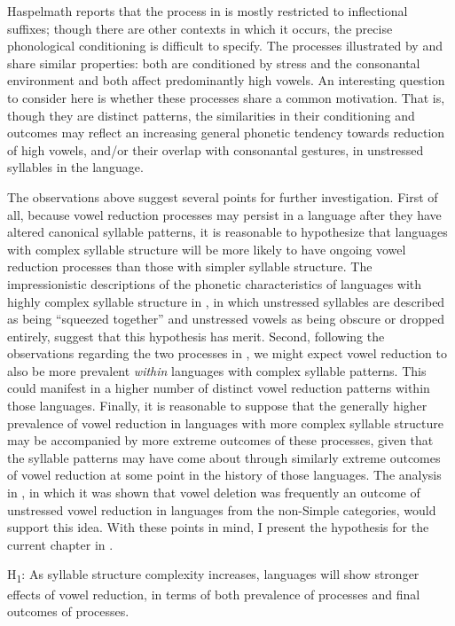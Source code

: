 Haspelmath reports that the process in  is mostly restricted to inflectional suffixes; though there are other contexts in which it occurs, the precise phonological conditioning is difficult to specify. The processes illustrated by  and  share similar properties: both are conditioned by stress and the consonantal environment and both affect predominantly high vowels. An interesting question to consider here is whether these processes share a common motivation. That is, though they are distinct patterns, the similarities in their conditioning and outcomes may reflect an increasing general phonetic tendency towards reduction of high vowels, and/or their overlap with consonantal gestures, in unstressed syllables in the language.

  The observations above suggest several points for further investigation. First of all, because vowel reduction processes may persist in a language after they have altered canonical syllable patterns, it is reasonable to hypothesize that languages with complex syllable structure will be more likely to have ongoing vowel reduction processes than those with simpler syllable structure. The impressionistic descriptions of the phonetic characteristics of languages with highly complex syllable structure in , in which unstressed syllables are described as being “squeezed together” and unstressed vowels as being obscure or dropped entirely, suggest that this hypothesis has merit. Second, following the observations regarding the two processes in , we might expect vowel reduction to also be more prevalent \textit{within} languages with complex syllable patterns. This could manifest in a higher number of distinct vowel reduction patterns within those languages. Finally, it is reasonable to suppose that the generally higher prevalence of vowel reduction in languages with more complex syllable structure may be accompanied by more extreme outcomes of these processes, given that the syllable patterns may have come about through similarly extreme outcomes of vowel reduction at some point in the history of those languages. The analysis in , in which it was shown that vowel deletion was frequently an outcome of unstressed vowel reduction in languages from the non-Simple categories, would support this idea. With these points in mind, I present the hypothesis for the current chapter in .

\ea\label{ex:6.3}
   H\textsubscript{1}:  As syllable structure complexity increases, languages will show stronger effects of vowel reduction, in terms of both prevalence of processes and final outcomes of processes.
\z

